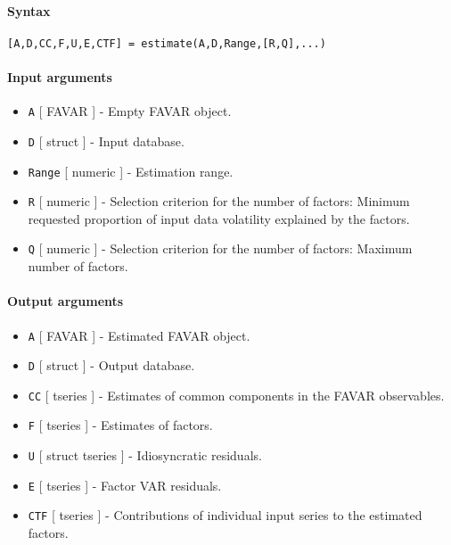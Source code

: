 


	\paragraph{Syntax}

\begin{verbatim}
[A,D,CC,F,U,E,CTF] = estimate(A,D,Range,[R,Q],...)
\end{verbatim}

\paragraph{Input arguments}

\begin{itemize}
\item
  \texttt{A} {[} FAVAR {]} - Empty FAVAR object.
\item
  \texttt{D} {[} struct {]} - Input database.
\item
  \texttt{Range} {[} numeric {]} - Estimation range.
\item
  \texttt{R} {[} numeric {]} - Selection criterion for the number of
  factors: Minimum requested proportion of input data volatility
  explained by the factors.
\item
  \texttt{Q} {[} numeric {]} - Selection criterion for the number of
  factors: Maximum number of factors.
\end{itemize}

\paragraph{Output arguments}

\begin{itemize}
\item
  \texttt{A} {[} FAVAR {]} - Estimated FAVAR object.
\item
  \texttt{D} {[} struct {]} - Output database.
\item
  \texttt{CC} {[} tseries {]} - Estimates of common components in the
  FAVAR observables.
\item
  \texttt{F} {[} tseries {]} - Estimates of factors.
\item
  \texttt{U} {[} struct \textbar{} tseries {]} - Idiosyncratic
  residuals.
\item
  \texttt{E} {[} tseries {]} - Factor VAR residuals.
\item
  \texttt{CTF} {[} tseries {]} - Contributions of individual input
  series to the estimated factors.
\end{itemize}

